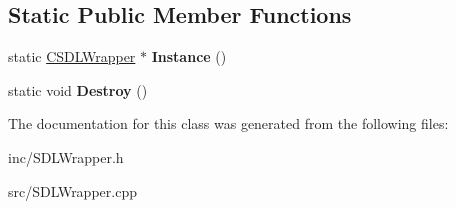 \subsection*{Static Public Member Functions}
\begin{DoxyCompactItemize}
\item 
\hypertarget{classCSDLWrapper_aafff4b431f939fe21143122b5ade38c5}{static \hyperlink{classCSDLWrapper}{C\-S\-D\-L\-Wrapper} $\ast$ {\bfseries Instance} ()}\label{classCSDLWrapper_aafff4b431f939fe21143122b5ade38c5}

\item 
\hypertarget{classCSDLWrapper_a4a40a3eb7da79638f98a95e7b5bd20d0}{static void {\bfseries Destroy} ()}\label{classCSDLWrapper_a4a40a3eb7da79638f98a95e7b5bd20d0}

\end{DoxyCompactItemize}


The documentation for this class was generated from the following files\-:\begin{DoxyCompactItemize}
\item 
inc/S\-D\-L\-Wrapper.\-h\item 
src/S\-D\-L\-Wrapper.\-cpp\end{DoxyCompactItemize}
